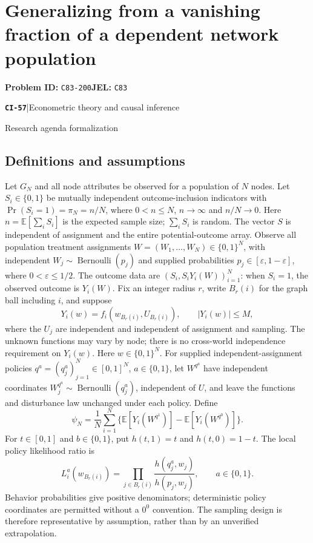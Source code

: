 \documentclass[11pt,a4paper]{article}
\newcommand{\E}{\mathbb E}
\newcommand{\entrymeta}[3]{{\sffamily\small\color{muted}\textbf{\texttt{#1}}\quad|\quad #2\par #3\par}}
\begin{document}
\section*{Generalizing from a vanishing fraction of a dependent network population}
\textbf{Problem ID:} \texttt{C83-200}\quad \textbf{JEL:} \texttt{C83}\par
\label{problem:OP-0536}
\label{beyond:CI-57}
\entrymeta{CI-57}{Econometric theory and causal inference}{Research agenda formalization}
\subsection*{Definitions and assumptions}
Let $G_N$ and all node attributes be observed for a population of $N$ nodes. Let $S_i\in\{0,1\}$ be mutually independent outcome-inclusion indicators with $\Pr(S_i=1)=\pi_N=n/N$, where $0<n\leq N$, $n\to\infty$ and $n/N\to0$. Here $n=\E[\sum_i S_i]$ is the expected sample size; $\sum_i S_i$ is random. The vector $S$ is independent of assignment and the entire potential-outcome array. Observe all population treatment assignments $W=(W_1,\ldots,W_N)\in\{0,1\}^N$, with independent $W_j\sim\operatorname{Bernoulli}(p_j)$ and supplied probabilities $p_j\in[\varepsilon,1-\varepsilon]$, where $0<\varepsilon\leq1/2$. The outcome data are $(S_i,S_iY_i(W))_{i=1}^N$: when $S_i=1$, the observed outcome is $Y_i(W)$. Fix an integer radius $r$, write $B_r(i)$ for the graph ball including $i$, and suppose
\[
 Y_i(w)=f_i(w_{B_r(i)},U_{B_r(i)}),\qquad |Y_i(w)|\leq M,
\]
where the $U_j$ are independent and independent of assignment and sampling. The unknown functions may vary by node; there is no cross-world independence requirement on $Y_i(w)$. Here $w\in\{0,1\}^N$. For supplied independent-assignment policies $q^a=(q_j^a)_{j=1}^N\in[0,1]^N$, $a\in\{0,1\}$, let $W^{q^a}$ have independent coordinates $W_j^{q^a}\sim\operatorname{Bernoulli}(q_j^a)$, independent of $U$, and leave the functions and disturbance law unchanged under each policy. Define
\[
 \psi_N=\frac1N\sum_{i=1}^N
 \{\E[Y_i(W^{q^1})]-\E[Y_i(W^{q^0})]\}.
\]
For $t\in[0,1]$ and $b\in\{0,1\}$, put $h(t,1)=t$ and $h(t,0)=1-t$. The local policy likelihood ratio is
\[
 L_i^a(w_{B_r(i)})=\prod_{j\in B_r(i)}
 \frac{h(q_j^a,w_j)}{h(p_j,w_j)},\qquad a\in\{0,1\}.
\]
Behavior probabilities give positive denominators; deterministic policy coordinates are permitted without a $0^0$ convention. The sampling design is therefore representative by assumption, rather than by an unverified extrapolation.
\end{document}
